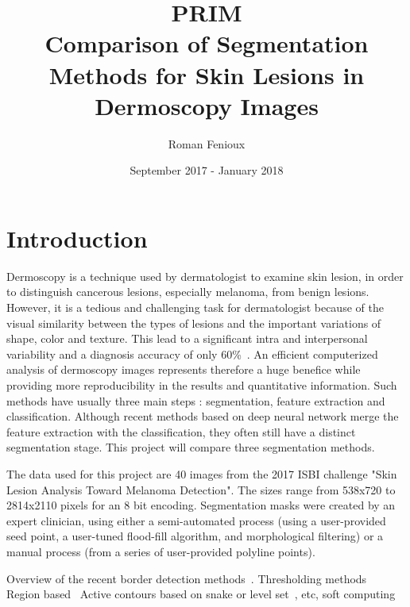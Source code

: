 \documentclass[a4paper,10pt]{article}
\title{PRIM\\ Comparison of Segmentation Methods for Skin Lesions in Dermoscopy Images}
\author{Roman Fenioux}
\date{September 2017 - January 2018}
\begin{document}
\maketitle
\newpage
\section*{Introduction}
Dermoscopy is a technique used by dermatologist to examine skin lesion, in order to distinguish cancerous lesions, especially melanoma, from benign lesions. However, it is a tedious and challenging task for dermatologist because of the visual similarity between the types of lesions and the important variations of shape, color and texture. This lead to a significant intra and interpersonal variability and a diagnosis accuracy of only 60\%~\cite{kittler_diagnostic_2002}. An efficient computerized analysis of dermoscopy images represents therefore a huge benefice while providing more reproducibility in the results and quantitative information. Such methods have usually three main steps : segmentation, feature extraction and classification. Although recent methods based on deep neural network merge the feature extraction with the classification, they often still have a distinct segmentation stage. This project will compare three segmentation methods.

The data used for this project are 40 images from the 2017 ISBI challenge "Skin Lesion Analysis Toward Melanoma Detection". The sizes range from 538x720 to 2814x2110 pixels for an 8 bit encoding. Segmentation masks were created by an expert clinician, using either a semi-automated process (using a user-provided seed point, a user-tuned flood-fill algorithm, and morphological filtering) or a manual process (from a series of user-provided polyline points).

Overview of the recent border detection methods~\cite{celebi_lesion_2009}.
Thresholding methods~\cite{mendonca_comparison_2007}~\cite{Garnavi2010}
Region based~\cite{celebi_border_2008}
Active contours based on snake or level set~\cite{mendonca_comparison_2007}, etc, soft computing~\cite{yu_automated_2017}

\end{document}
